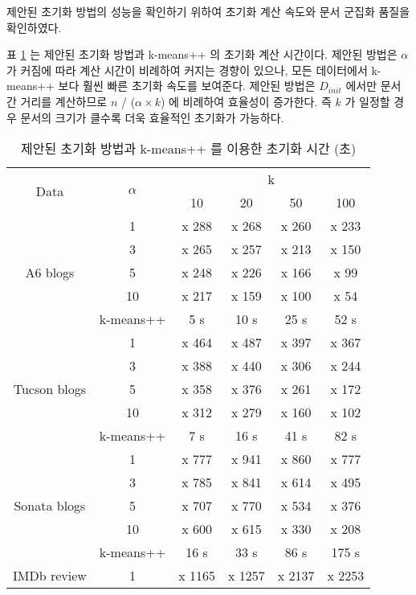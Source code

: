 \documentclass[oneside, ko,phd]{snuthesis_utf8_kor}
\begin{document}
제안된 초기화 방법의 성능을 확인하기 위하여 초기화 계산 속도와 문서 군집화 품질을 확인하였다.

표 \ref{tab:performance_initialization_time} 는 제안된 초기화 방법과 k-means++ 의 초기화 계산 시간이다.
제안된 방법은 $\alpha$ 가 커짐에 따라 계산 시간이 비례하여 커지는 경향이 있으나, 모든 데이터에서 k-means++ 보다 훨씬 빠른 초기화 속도를 보여준다.
제안된 방법은 $D_{init}$ 에서만 문서 간 거리를 계산하므로 $n$ / ($\alpha \times k$) 에 비례하여 효율성이 증가한다.
즉 $k$ 가 일정할 경우 문서의 크기가 클수록 더욱 효율적인 초기화가 가능하다.

\begin{table}[H]
\small
\centering
\caption{제안된 초기화 방법과 k-means++ 를 이용한 초기화 시간 (초)}
\label{tab:performance_initialization_time}
\renewcommand{\arraystretch}{.67}
\begin{tabular}{|c|c|c|c|c|c|}
\hline
\multirow{2}{*}{Data} & \multirow{2}{*}{$\alpha$} & \multicolumn{4}{c|}{k} \\ \cline{3-6} 
 &  & 10 & 20 & 50 & 100 \\ \hline
\multirow{5}{*}{A6 blogs} & 1 & x 288 & x 268 & x 260 & x 233 \\ \cline{2-6} 
 & 3 & x 265 & x 257 & x 213 & x 150 \\ \cline{2-6} 
 & 5 & x 248 & x 226 & x 166 & x 99 \\ \cline{2-6} 
 & 10 & x 217 & x 159 & x 100 & x 54 \\ \cline{2-6} 
 & k-means++ & 5 s & 10 s & 25 s & 52 s \\ \hline
\multirow{5}{*}{Tucson blogs} & 1 & x 464 & x 487 & x 397 & x 367 \\ \cline{2-6} 
 & 3 & x 388 & x 440 & x 306 & x 244 \\ \cline{2-6} 
 & 5 & x 358 & x 376 & x 261 & x 172 \\ \cline{2-6} 
 & 10 & x 312 & x 279 & x 160 & x 102 \\ \cline{2-6} 
 & k-means++ & 7 s & 16 s & 41 s & 82 s \\ \hline
\multirow{5}{*}{Sonata blogs} & 1 & x 777 & x 941 & x 860 & x 777 \\ \cline{2-6} 
 & 3 & x 785 & x 841 & x 614 & x 495 \\ \cline{2-6} 
 & 5 & x 707 & x 770 & x 534 & x 376 \\ \cline{2-6} 
 & 10 & x 600 & x 615 & x 330 & x 208 \\ \cline{2-6} 
 & k-means++ & 16 s & 33 s & 86 s & 175 s \\ \hline
\multirow{5}{*}{IMDb review} & 1 & x 1165 & x 1257 & x 2137 & x 2253 \\ \cline{2-6} 

\end{tabular}
\end{table}
\end{document}
